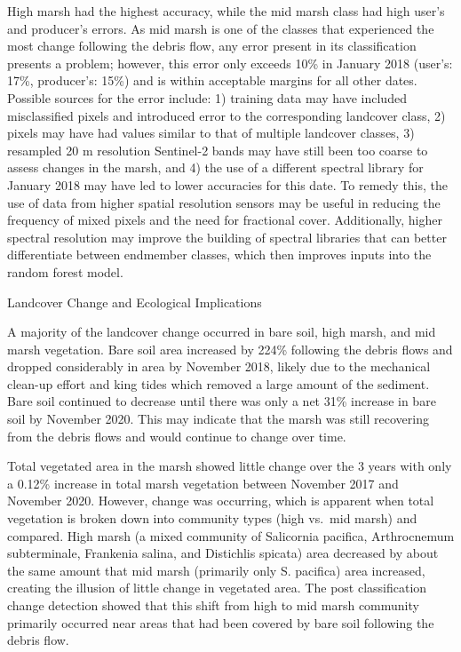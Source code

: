 \documentclass[
]{article}
\begin{document}
High marsh had the highest accuracy, while the mid marsh class had high
user's and producer's errors. As mid marsh is one of the classes that
experienced the most change following the debris flow, any error present
in its classification presents a problem; however, this error only
exceeds 10\% in January 2018 (user's: 17\%, producer's: 15\%) and is
within acceptable margins for all other dates. Possible sources for the
error include: 1) training data may have included misclassified pixels
and introduced error to the corresponding landcover class, 2) pixels may
have had values similar to that of multiple landcover classes, 3)
resampled 20 m resolution Sentinel-2 bands may have still been too
coarse to assess changes in the marsh, and 4) the use of a different
spectral library for January 2018 may have led to lower accuracies for
this date. To remedy this, the use of data from higher spatial
resolution sensors may be useful in reducing the frequency of mixed
pixels and the need for fractional cover. Additionally, higher spectral
resolution may improve the building of spectral libraries that can
better differentiate between endmember classes, which then improves
inputs into the random forest model.

Landcover Change and Ecological Implications

A majority of the landcover change occurred in bare soil, high marsh,
and mid marsh vegetation. Bare soil area increased by 224\% following
the debris flows and dropped considerably in area by November 2018,
likely due to the mechanical clean-up effort and king tides which
removed a large amount of the sediment. Bare soil continued to decrease
until there was only a net 31\% increase in bare soil by November 2020.
This may indicate that the marsh was still recovering from the debris
flows and would continue to change over time.

Total vegetated area in the marsh showed little change over the 3 years
with only a 0.12\% increase in total marsh vegetation between November
2017 and November 2020. However, change was occurring, which is apparent
when total vegetation is broken down into community types (high vs.~mid
marsh) and compared. High marsh (a mixed community of Salicornia
pacifica, Arthrocnemum subterminale, Frankenia salina, and Distichlis
spicata) area decreased by about the same amount that mid marsh
(primarily only S. pacifica) area increased, creating the illusion of
little change in vegetated area. The post classification change
detection showed that this shift from high to mid marsh community
primarily occurred near areas that had been covered by bare soil
following the debris flow.
\end{document}
